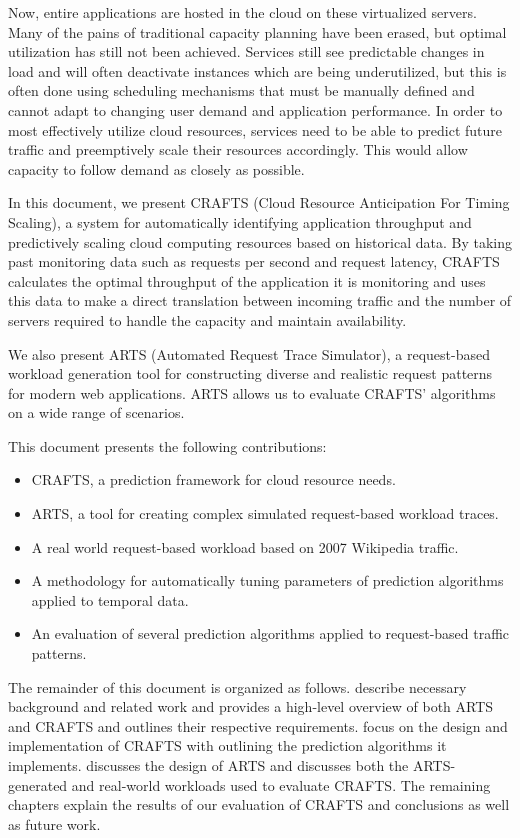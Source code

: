 Now, entire applications are hosted in the cloud on these virtualized servers. Many of the pains of traditional capacity planning have been erased, but optimal utilization has still not been achieved. Services still see predictable changes in load and will often deactivate instances which are being underutilized, but this is often done using scheduling mechanisms that must be manually defined and cannot adapt to changing user demand and application performance. In order to most effectively utilize cloud resources, services need to be able to predict future traffic and preemptively scale their resources accordingly. This would allow capacity to follow demand as closely as possible.

In this document, we present CRAFTS (Cloud Resource Anticipation For Timing Scaling), a system for automatically identifying application throughput and predictively scaling cloud computing resources based on historical data. By taking past monitoring data such as requests per second and request latency, CRAFTS calculates the optimal throughput of the application it is monitoring and uses this data to make a direct translation between incoming traffic and the number of servers required to handle the capacity and maintain availability.

We also present ARTS (Automated Request Trace Simulator), a request-based workload generation tool for constructing diverse and realistic request patterns for modern web applications. ARTS allows us to evaluate CRAFTS' algorithms on a wide range of scenarios.

This document presents the following contributions:

\begin{itemize}
    \item CRAFTS, a prediction framework for cloud resource needs.
    \item ARTS, a tool for creating complex simulated request-based workload traces.
    \item A real world request-based workload based on 2007 Wikipedia traffic.
    \item A methodology for automatically tuning parameters of prediction algorithms applied to temporal data.
    \item An evaluation of several prediction algorithms applied to request-based traffic patterns.
\end{itemize}

The remainder of this document is organized as follows.  describe necessary background and related work and  provides a high-level overview of both ARTS and CRAFTS and outlines their respective requirements.  focus on the design and implementation of CRAFTS with  outlining the prediction algorithms it implements.  discusses the design of ARTS and  discusses both the ARTS-generated and real-world workloads used to evaluate CRAFTS. The remaining chapters explain the results of our evaluation of CRAFTS and conclusions as well as future work.